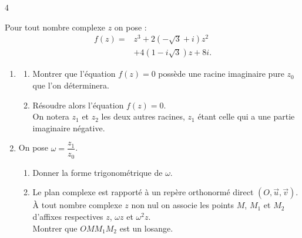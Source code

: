 \documentclass{axiobac}
\begin{document}
\entete

\begin{exercice}{4}

Pour tout nombre complexe $z$ on pose :
\[
\begin{aligned}
f(z) = {} & z^3 + 2\left(-\sqrt{3} + i\right) z^2 \\
          & + 4\left(1 - i\sqrt{3}\right) z + 8i .
\end{aligned}
\]

\begin{enumerate}
    \item
    \begin{enumerate}
        \item Montrer que l'équation $f(z) = 0$ possède une racine imaginaire pure $z_0$ que l'on déterminera.
        \item Résoudre alors l'équation $f(z) = 0$. \\
        On notera $z_1$ et $z_2$ les deux autres racines, $z_1$ étant celle qui a une partie imaginaire négative.
    \end{enumerate}
    \item On pose $\omega = \dfrac{z_1}{z_0}$.
    \begin{enumerate}
        \item Donner la forme trigonométrique de $\omega$.
        \item Le plan complexe est rapporté à un repère orthonormé direct $(O, \vec{u}, \vec{v})$. \\
        À tout nombre complexe $z$ non nul on associe les points $M$, $M_1$ et $M_2$ d'affixes respectives $z$, $\omega z$ et $\omega^2 z$. \\
        Montrer que $OMM_1M_2$ est un losange.
    \end{enumerate}
\end{enumerate}

\end{exercice}
\end{document}
